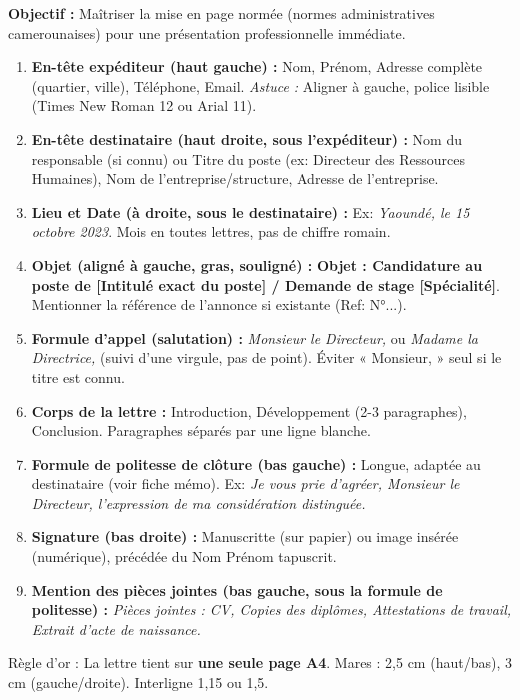 \documentclass[11pt]{article}
\newcommand{\cle}[1]{{\popxbold\color{popdark}#1}}
\begin{document}
\begin{methode}
\textbf{Objectif :} Maîtriser la mise en page normée (normes administratives camerounaises) pour une présentation professionnelle immédiate.
\begin{enumerate}
\item \textbf{En-tête expéditeur (haut gauche) :} Nom, Prénom, Adresse complète (quartier, ville), Téléphone, Email. \emph{Astuce :} Aligner à gauche, police lisible (Times New Roman 12 ou Arial 11).
\item \textbf{En-tête destinataire (haut droite, sous l'expéditeur) :} Nom du responsable (si connu) ou Titre du poste (ex: Directeur des Ressources Humaines), Nom de l'entreprise/structure, Adresse de l'entreprise.
\item \textbf{Lieu et Date (à droite, sous le destinataire) :} Ex: \textit{Yaoundé, le 15 octobre 2023}. Mois en toutes lettres, pas de chiffre romain.
\item \textbf{Objet (aligné à gauche, gras, souligné) :} \textbf{Objet : Candidature au poste de [Intitulé exact du poste] / Demande de stage [Spécialité]}. Mentionner la référence de l'annonce si existante (Ref: N°...).
\item \textbf{Formule d'appel (salutation) :} \textit{Monsieur le Directeur,} ou \textit{Madame la Directrice,} (suivi d'une virgule, pas de point). Éviter « Monsieur, » seul si le titre est connu.
\item \textbf{Corps de la lettre :} Introduction, Développement (2-3 paragraphes), Conclusion. Paragraphes séparés par une ligne blanche.
\item \textbf{Formule de politesse de clôture (bas gauche) :} Longue, adaptée au destinataire (voir fiche mémo). Ex: \textit{Je vous prie d'agréer, Monsieur le Directeur, l'expression de ma considération distinguée.}
\item \textbf{Signature (bas droite) :} Manuscritte (sur papier) ou image insérée (numérique), précédée du Nom Prénom tapuscrit.
\item \textbf{Mention des pièces jointes (bas gauche, sous la formule de politesse) :} \textit{Pièces jointes : CV, Copies des diplômes, Attestations de travail, Extrait d'acte de naissance.}
\end{enumerate}
\cle{Règle d'or :} La lettre tient sur \textbf{une seule page A4}. Mares : 2,5 cm (haut/bas), 3 cm (gauche/droite). Interligne 1,15 ou 1,5.
\end{methode}
\end{document}

